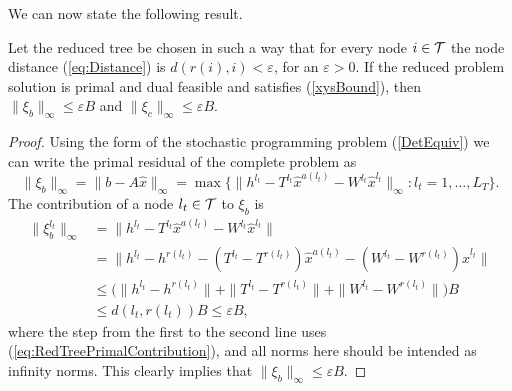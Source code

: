 We can now state the following result.
%
\begin{lemma}  \label{th:BoundResiduals}
Let the reduced tree be chosen in such a way that for every node 
$i \in \mathcal{T}$ the node distance (\ref{eq:Distance}) is 
$d(r(i), i) < \varepsilon$, for an $\varepsilon > 0$.
If the reduced problem solution is primal and dual feasible  
and satisfies (\ref{xysBound}), then
$\| \xi_b \|_{\infty} \leq \varepsilon B$
and  $\| \xi_c \|_{\infty} \leq \varepsilon B$.
\end{lemma} 
%
\begin{proof}
Using the form of the stochastic programming problem (\ref{DetEquiv})
we can write the primal residual of the complete problem as
\[
  \|\xi_b\|_\infty = \|b-A\hat x\|_\infty 
                   = \max\{\|h^{l_t} - T^{l_t}\hat x^{a(l_t)} 
                     - W^{l_t}\hat x^{l_t}\|_\infty:l_t = 1,\ldots,L_T\}.
\]
%
The contribution of a node $l_t \in \mathcal{T}$ to $\xi_b$ is 
\[
\begin{split}
  \| \xi_b^{l_t} \|_{\infty}
    & = \|h^{l_t}\!-\!T^{l_t}\hat x^{a(l_t)}\!-\!W^{l_t}\hat x^{l_t}\| \\
    & = \|h^{l_t} \!-\! h^{r(l_t)} - (T^{l_t} \!- T^{r(l_t)})\hat x^{a(l_t)}
        - (W^{l_t} - W^{r(l_t)}) \hat x^{l_t}\| \\
    & \le \big( \|h^{l_t} \! - \! h^{r(l_t)}\| +
           \|T^{l_t} \! - \! T^{r(l_t)}\| +
           \|W^{l_t} \! - \! W^{r(l_t)}\| \big) B \\
    & \le  d(l_t, r(l_t)) B \le \varepsilon B,
\end{split}
\]
where the step from the first to the second line uses 
(\ref{eq:RedTreePrimalContribution}), and all norms here should be
intended as infinity norms.
%
This clearly implies that $\| \xi_b \|_\infty \le \varepsilon B$. 


\end{proof}
